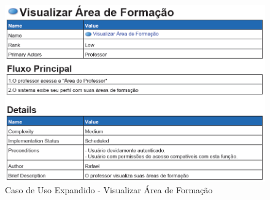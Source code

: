 \documentclass{abnt}
\begin{document}
\begin{figure}[h]
			\begin{center}
				 \includegraphics[width=450px]{casoUsoVisualizarAreaFormacao}
				 \caption{Caso de Uso Expandido - Visualizar Área de Formação}
			\end{center}
		\end{figure}
		
\end{document}
